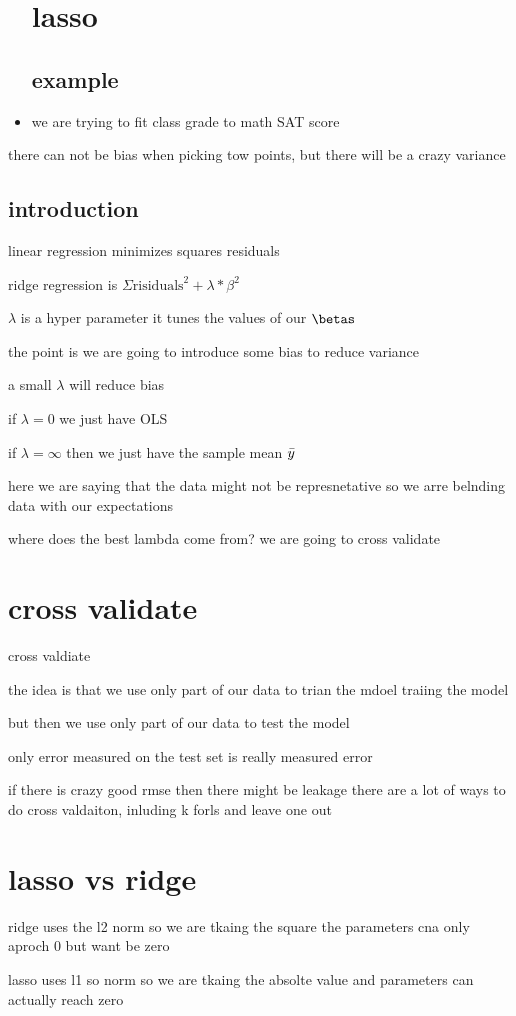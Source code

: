 \documentclass{article}
\begin{document}
\begin{itemize}
\section{lasso}
\subsection{example}
\item we are trying to fit class grade to math SAT score
\end{itemize}
\item there can not be bias when picking tow points, but there will be a crazy variance 
\subsection{introduction}
\item linear regression minimizes squares residuals 
\item ridge regression is $\Sigma \text{risiduals}^2+\lambda *\beta ^2$
\item $\lambda$ is a hyper parameter it tunes the values of our $\betas$
\item the point is we are going to introduce some bias to reduce variance 
\item a small $\lambda $ will reduce bias 
\item if $\lambda=0$ we just have OLS
\item if $\lambda=\infty$ then we just have the sample mean $\Bar{y}$
\item here we are saying that the data might not be represnetative so we arre belnding data with our expectations 
\item where does the best lambda come from? we are going to cross validate
\section{cross validate}
\item cross valdiate 
\item the idea is that we use only part of our data to trian the mdoel traiing the model 
\item but then we use only part of our data to test the model 
\item only error measured on the test set is really measured error 
\item if there is crazy good rmse then there might be leakage 
\itme there are a lot of ways to do cross valdaiton, inluding k forls and leave one out 
\section{lasso vs ridge}
\item ridge uses the l2 norm so we are tkaing the square the parameters cna only aproch 0 but want be zero
\item lasso uses l1 so norm so we are tkaing the absolte value and parameters can actually reach zero 
\end{document}
